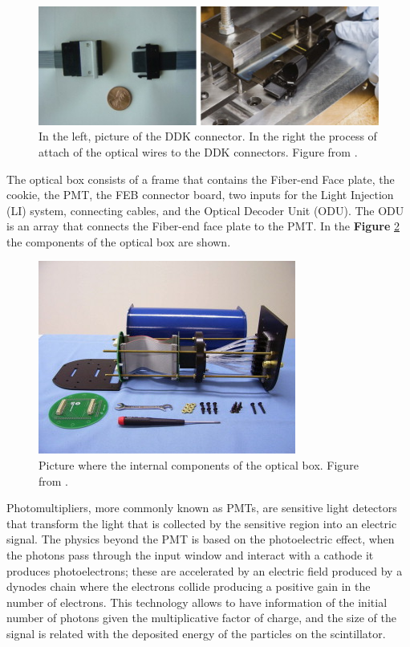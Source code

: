 \begin{figure}[!htb]
    \centering
    \includegraphics{Figures/Chapter2/OpticCablesConnectors.jpg}
    \caption{In the left, picture of the DDK connector. In the right the process of attach of the optical wires to the DDK connectors. Figure from \cite{MINERvA}.}
    \label{fig:MnvExp:MnvDetector:DDKConnector}
\end{figure}

The optical box consists of a frame that contains the Fiber-end Face plate, the cookie, the PMT, the FEB connector board, two inputs for the Light Injection (LI) system, connecting cables, and the Optical Decoder Unit (ODU). The ODU is an array that connects the Fiber-end face plate to the PMT. In the \textbf{Figure} \ref{fig:MnvExp:MnvDetector:OpticalBox} the components of the optical box are shown. 

\begin{figure}[!htb]
    \centering
    \includegraphics{Figures/Chapter2/OpticaBox.jpg}
    \caption{Picture where the internal components of the optical box. Figure from \cite{MINERvA}.}
    \label{fig:MnvExp:MnvDetector:OpticalBox}
\end{figure}

Photomultipliers, more commonly known as PMTs, are sensitive light detectors that transform the light that is collected by the sensitive region into an electric signal. The physics beyond the PMT is based on the photoelectric effect, when the photons pass through the input window and interact with a cathode it produces photoelectrons; these are accelerated by an electric field produced by a dynodes chain where the electrons collide producing a positive gain in the number of electrons. This technology allows to have information of the initial number of photons given the multiplicative factor of charge, and the size of the signal is related with the deposited energy of the particles on the scintillator. 

